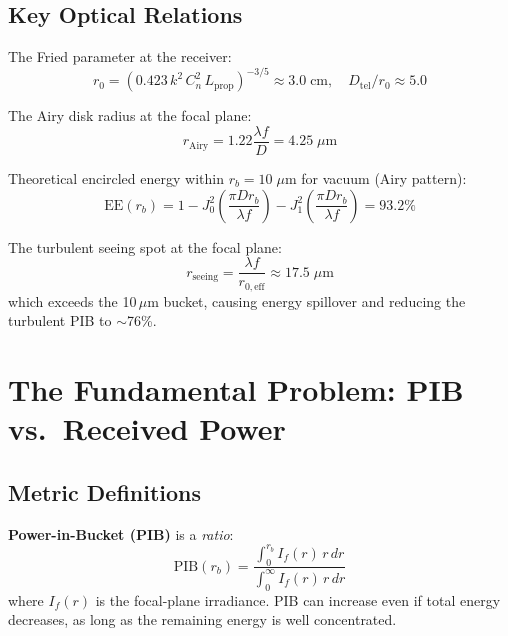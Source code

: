 \documentclass[11pt,a4paper]{article}
\begin{document}
\subsection{Key Optical Relations}

The Fried parameter at the receiver:
\begin{equation}
r_0 = \left(0.423\, k^2\, C_n^2\, L_{\mathrm{prop}}\right)^{-3/5} \approx 3.0\;\mathrm{cm}, \quad D_{\mathrm{tel}}/r_0 \approx 5.0
\end{equation}

The Airy disk radius at the focal plane:
\begin{equation}
r_{\mathrm{Airy}} = 1.22 \frac{\lambda f}{D} = 4.25\;\mu\mathrm{m}
\end{equation}

Theoretical encircled energy within $r_b = 10\;\mu$m for vacuum (Airy pattern):
\begin{equation}
\mathrm{EE}(r_b) = 1 - J_0^2\!\left(\frac{\pi D r_b}{\lambda f}\right) - J_1^2\!\left(\frac{\pi D r_b}{\lambda f}\right) = 93.2\%
\end{equation}

The turbulent seeing spot at the focal plane:
\begin{equation}
r_{\mathrm{seeing}} = \frac{\lambda f}{r_{0,\mathrm{eff}}} \approx 17.5\;\mu\mathrm{m}
\end{equation}
which exceeds the 10\,$\mu$m bucket, causing energy spillover and reducing the turbulent PIB to $\sim$76\%.

\section{The Fundamental Problem: PIB vs.\ Received Power}
\label{sec:problem}

\subsection{Metric Definitions}

\textbf{Power-in-Bucket (PIB)} is a \textit{ratio}:
\begin{equation}
\mathrm{PIB}(r_b) = \frac{\int_0^{r_b} I_f(r)\, r\, dr}{\int_0^{\infty} I_f(r)\, r\, dr}
\end{equation}
where $I_f(r)$ is the focal-plane irradiance. PIB can increase even if total energy decreases, as long as the remaining energy is well concentrated.
\end{document}
